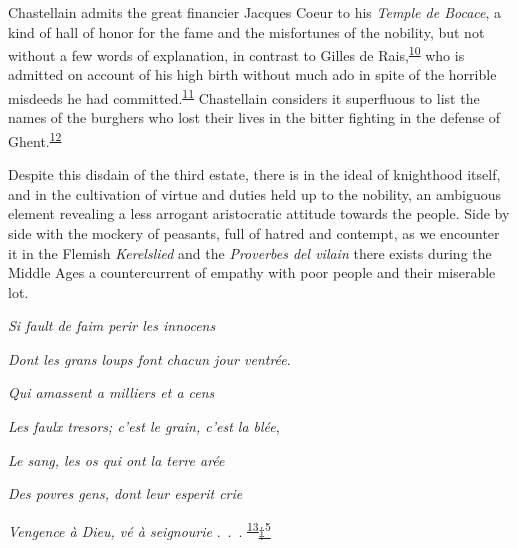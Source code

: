 Chastellain admits the great financier Jacques Coeur to his \emph{Temple
de Bocace}, a kind of hall of honor for the fame and the misfortunes of
the nobility, but not without a few words of explanation, in contrast to
Gilles de
Rais,\textsuperscript{\protect\hypertarget{10_Chapter_Three__THE_HEROIC_DREAM.xhtmlux5cux23id_1911}{\protect\hyperlink{23_NOTES.xhtmlux5cux23id_1912}{10}}}
who is admitted on account of his high birth without much ado in spite
of the horrible misdeeds he had
committed.\textsuperscript{\protect\hypertarget{10_Chapter_Three__THE_HEROIC_DREAM.xhtmlux5cux23id_1909}{\protect\hyperlink{23_NOTES.xhtmlux5cux23id_1910}{11}}}
Chastellain considers it superfluous to list the names of the burghers
who lost their lives in the bitter fighting in the defense of
Ghent.\textsuperscript{\protect\hypertarget{10_Chapter_Three__THE_HEROIC_DREAM.xhtmlux5cux23id_1907}{\protect\hyperlink{23_NOTES.xhtmlux5cux23id_1908}{12}}}

Despite this disdain of the third estate, there is in the ideal of
knighthood itself, and in the cultivation of virtue and duties held up
to the nobility, an ambiguous element revealing a less arrogant
aristocratic attitude towards the people. Side by side with the mockery
of peasants, full of hatred and contempt, as we encounter it in the
Flemish \emph{Kerelslied} and the \emph{Proverbes del vilain} there
exists during the Middle Ages a countercurrent of empathy with poor
people and their miserable lot.

\emph{Si fault de faim perir les innocens}

\emph{Dont les grans loups font chacun jour ventrée}.

\emph{Qui amassent a milliers et a cens}

\emph{Les faulx tresors; c'est le grain, c'est la blée},

\emph{Le sang, les os qui ont la terre arée}

\emph{Des povres gens, dont leur esperit crie}

\emph{Vengence à Dieu, vé à seignourie} .~.~.
\textsuperscript{\protect\hypertarget{10_Chapter_Three__THE_HEROIC_DREAM.xhtmlux5cux23id_1905}{\protect\hyperlink{23_NOTES.xhtmlux5cux23id_1906}{13}}}\protect\hypertarget{10_Chapter_Three__THE_HEROIC_DREAM.xhtmlux5cux23id_2473}{\protect\hyperlink{23_NOTES.xhtmlux5cux23id_2474}{‡\textsuperscript{5}}}

